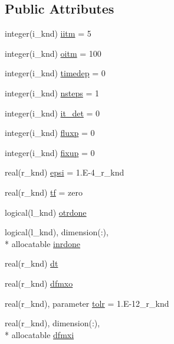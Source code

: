 \subsection*{Public Attributes}
\begin{DoxyCompactItemize}
\item 
integer(i\-\_\-knd) \hyperlink{classcontrol__module_a668776c82e56b5c08c95f01915287eb2}{iitm} = 5
\item 
integer(i\-\_\-knd) \hyperlink{classcontrol__module_a99fddac51dc4299027ab5afd97c5c7ea}{oitm} = 100
\item 
integer(i\-\_\-knd) \hyperlink{classcontrol__module_a19077c84dfe2f11b40e39a9a63178731}{timedep} = 0
\item 
integer(i\-\_\-knd) \hyperlink{classcontrol__module_a94e5569686ecc448c8fb807946cf95fb}{nsteps} = 1
\item 
integer(i\-\_\-knd) \hyperlink{classcontrol__module_a47222ebdff0b8cbd932da30c43572177}{it\-\_\-det} = 0
\item 
integer(i\-\_\-knd) \hyperlink{classcontrol__module_afb6375328be86057f0ac0af554c9abac}{fluxp} = 0
\item 
integer(i\-\_\-knd) \hyperlink{classcontrol__module_ad305163b99235b021c5cf0f91e69c6d5}{fixup} = 0
\item 
real(r\-\_\-knd) \hyperlink{classcontrol__module_af1c813926ca0adb64361e5b48a4f73b9}{epsi} = 1.\-E-\/4\-\_\-r\-\_\-knd
\item 
real(r\-\_\-knd) \hyperlink{classcontrol__module_a144620f0322c0ca01d9034fedd8d1076}{tf} = zero
\item 
logical(l\-\_\-knd) \hyperlink{classcontrol__module_a2a2bc582701b890779931ca8180a79e4}{otrdone}
\item 
logical(l\-\_\-knd), dimension(\-:), \\*
allocatable \hyperlink{classcontrol__module_a800d3f9715c61376ad1a2d5b5b77e116}{inrdone}
\item 
real(r\-\_\-knd) \hyperlink{classcontrol__module_af466573cb3712b4a00c930a1720eeb68}{dt}
\item 
real(r\-\_\-knd) \hyperlink{classcontrol__module_a53a34dce98c72051d0043743774ea209}{dfmxo}
\item 
real(r\-\_\-knd), parameter \hyperlink{classcontrol__module_ad7c6872b7fb56bee7e7870e4ffa9dc65}{tolr} = 1.\-E-\/12\-\_\-r\-\_\-knd
\item 
real(r\-\_\-knd), dimension(\-:), \\*
allocatable \hyperlink{classcontrol__module_a39abfd20b09ff5ed5e22b69c92038156}{dfmxi}
\end{DoxyCompactItemize}



